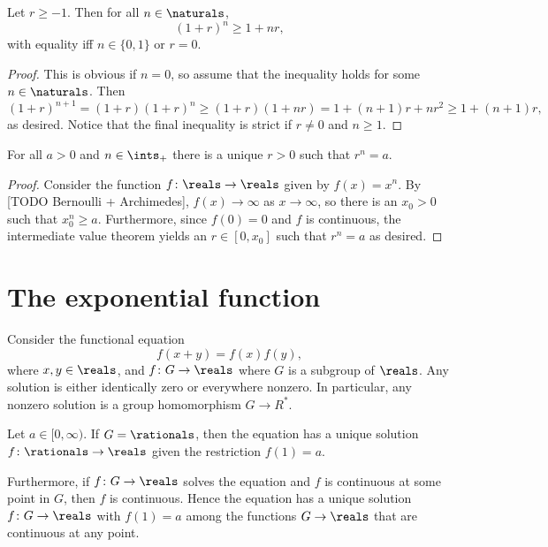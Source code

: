 \documentclass[article, a4paper, 11pt, oneside]{memoir}
\numberwithin{equation}{chapter}
\newcommand{\posints}{\ints_{+}}
\begin{document}
\begin{lemma}
    Let $r \geq -1$. Then for all $n \in \naturals$,
    \begin{equation*}
        (1+r)^n \geq 1 + nr,
    \end{equation*}
    with equality iff $n \in \{0,1\}$ or $r = 0$.
\end{lemma}

\begin{proof}
    This is obvious if $n = 0$, so assume that the inequality holds for some $n \in \naturals$. Then
    \begin{equation*}
        (1+r)^{n+1}
            = (1+r)(1+r)^n
            \geq (1+r)(1+nr)
            = 1 + (n+1)r + nr^2
            \geq 1 + (n+1)r,
    \end{equation*}
    as desired. Notice that the final inequality is strict if $r \neq 0$ and $n \geq 1$.
\end{proof}


\begin{theorem}
    For all $a > 0$ and $n \in \posints$ there is a unique $r > 0$ such that $r^n = a$.
\end{theorem}

\begin{proof}
    Consider the function $f \colon \reals \to \reals$ given by $f(x) = x^n$. By [TODO Bernoulli + Archimedes], $f(x) \to \infty$ as $x \to \infty$, so there is an $x_0 > 0$ such that $x_0^n \geq a$. Furthermore, since $f(0) = 0$ and $f$ is continuous, the intermediate value theorem yields an $r \in [0,x_0]$ such that $r^n = a$ as desired.
\end{proof}


\section{The exponential function}

\begin{lemma}
    Consider the functional equation
    \begin{equation*}
        f(x+y) = f(x)f(y),
    \end{equation*}
    where $x,y \in \reals$, and $f \colon G \to \reals$ where $G$ is a subgroup of $\reals$. Any solution is either identically zero or everywhere nonzero. In particular, any nonzero solution is a group homomorphism $G \to R^*$.
    
    Let $a \in [0,\infty)$. If $G = \rationals$, then the equation has a unique solution $f \colon \rationals \to \reals$ given the restriction $f(1) = a$.

    Furthermore, if $f \colon G \to \reals$ solves the equation and $f$ is continuous at some point in $G$, then $f$ is continuous. Hence the equation has a unique solution $f \colon G \to \reals$ with $f(1) = a$ among the functions $G \to \reals$ that are continuous at any point.
\end{lemma}
\end{document}

